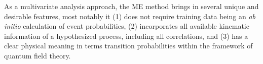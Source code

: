 As a multivariate analysis approach, the ME method brings in several unique and desirable features, most notably it (1) does not require training data being an \emph{ab initio} calculation of event probabilities, (2) incorporates all available kinematic information of a hypothesized process, including all correlations, and (3) has a clear physical meaning in terms transition probabilities within the framework of quantum field theory.


